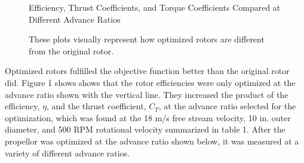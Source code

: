 \documentclass{article}
\begin{document}
\begin{figure}
  \centering

  \hspace{1em}
  \caption{Efficiency, Thrust Coefficients, and Torque Coefficients Compared at Different Advance Ratios}
  \captionsetup{aboveskip=0pt,font=it}
  \caption*{These plots visually represent how optimized rotors are different from the original rotor.}
  \label{fig:1}
\end{figure}

Optimized rotors fulfilled the objective function better than the original rotor did. Figure 1 shows shows that the rotor efficiencies were only optimized at the advance ratio shown with the vertical line. They increased the product of the efficiency, $\eta$, and the thrust coefficient, $C_{T}$, at the advance ratio selected for the optimization, which was found at the 18 m/s free stream velocity, 10 in. outer diameter, and 500 RPM rotational velocity summarized in table 1. After the propellor was optimized at the advance ratio shown below, it was measured at a variety of different advance ratios. \newline \break
\end{document}
